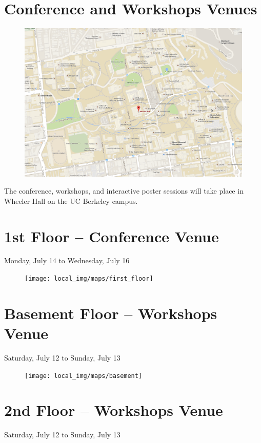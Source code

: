 \clearpage
{} \section{Conference and Workshops Venues}
\begin{figure}[h!]
\includegraphics[width=\linewidth]{local_img/maps/wheeler_hall}
\end{figure}

The conference, workshops, and interactive poster sessions will take place in Wheeler Hall on the UC Berkeley campus. 

\newpage
{} \section{1st Floor -- Conference Venue}
{\large Monday, July 14 to Wednesday, July 16}
\begin{figure}[h!]
\center
\texttt{[image: local\_img/maps/first\_floor]}
\end{figure}

\newpage
{} \section{Basement Floor -- Workshops Venue}
{\large Saturday, July 12 to Sunday, July 13}

\begin{figure}[h!]
\center
\texttt{[image: local\_img/maps/basement]}
\end{figure}

\newpage
{} \section{2nd Floor -- Workshops Venue}
{\large Saturday, July 12 to Sunday, July 13}

